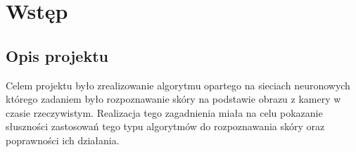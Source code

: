 \chapter{Wstęp}
\label{cha:introduction}

\section{Opis projektu}
Celem projektu było zrealizowanie algorytmu opartego na sieciach neuronowych którego zadaniem było rozpoznawanie skóry na podstawie obrazu z kamery w czasie rzeczywistym. Realizacja tego zagadnienia miała na celu pokazanie słuszności zastosowań tego typu algorytmów do rozpoznawania skóry oraz poprawności ich działania. 


